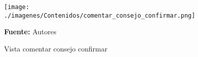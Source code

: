 \begin{figure}[!htb]
  \begin{center}
\texttt{[image: ./imagenes/Contenidos/comentar\_consejo\_confirmar.png]}
    \caption{Vista comentar consejo confirmar}
    \label{fig:Vista_comentar_consejo_confirmar}
    \textbf{Fuente:}  Autores
  \end{center}
\end{figure}
